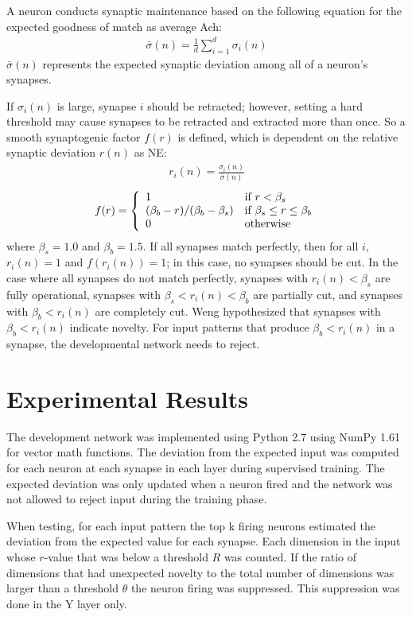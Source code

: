 \documentclass[conference]{IEEEtran}
\begin{document}
A neuron conducts synaptic maintenance based on the following equation for the expected goodness of match
as average Ach:
\begin{align}\bar{\sigma}(n)=\frac{1}{d}\sum_{i=1}^d\sigma_i(n)\end{align}
$\bar{\sigma}(n)$ represents the expected synaptic deviation among all of a neuron's synapses.

If $\sigma_i(n)$ is large, synapse $i$ should be retracted; however, setting a hard threshold may cause synapses to be retracted and extracted more than once. So a smooth synaptogenic factor $f(r)$ is defined, which is dependent on the relative synaptic deviation $r(n)$ as NE:
\begin{align}r_i(n)=\frac{\sigma_i(n)}{\bar{\sigma}(n)}\end{align}
\begin{align}
f(r)=\left\{
\begin{array}{l l}
1 & \text{if $r < \beta_s$} \\
(\beta_b-r)/(\beta_b-\beta_s) & \text{if $\beta_s \le r \le \beta_b$} \\
0 & \text{otherwise}
\end{array}\right.\end{align}
where $\beta_s=1.0$ and $\beta_b=1.5$. If all synapses match perfectly, then for all $i$, $r_i(n)=1$ and $f(r_i(n))=1$; in this case, no synapses should be cut. In the case where all synapses do not match perfectly, synapses with $r_i(n) < \beta_s$ are fully operational, synapses with $\beta_s < r_i(n) < \beta_b$ are partially cut, and synapses with $\beta_b < r_i(n)$ are completely cut. Weng \cite{WengNAI12} hypothesized that synapses with $\beta_b < r_i(n)$ indicate novelty. For input patterns that produce $\beta_b < r_i(n)$ in a synapse, the developmental network needs to reject.

\section{Experimental Results}

The development network was implemented using Python 2.7 using NumPy 1.61 for vector math functions.  The deviation from the expected input was computed for each neuron at each synapse in each layer during supervised training.  The expected deviation was only updated when a neuron fired and the network was not allowed to reject input during the training phase.

When testing, for each input pattern the top k firing neurons estimated the deviation from the expected value for each synapse.  Each dimension in the input whose $r$-value that was below a threshold $R$ was counted.  If the ratio of dimensions that had unexpected novelty to the total number of dimensions was larger than a threshold $\theta$ the neuron firing was suppressed.  This suppression was done in the Y layer only.
\end{document}
